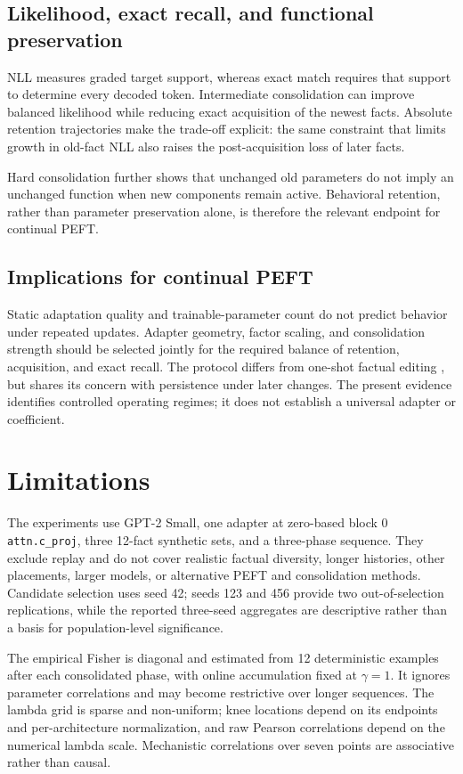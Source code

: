 \documentclass[12pt,a4paper]{article}
\begin{document}
\subsection{Likelihood, exact recall, and functional preservation}
NLL measures graded target support, whereas exact match requires that support to determine every decoded token. Intermediate consolidation can improve balanced likelihood while reducing exact acquisition of the newest facts. Absolute retention trajectories make the trade-off explicit: the same constraint that limits growth in old-fact NLL also raises the post-acquisition loss of later facts.

Hard consolidation further shows that unchanged old parameters do not imply an unchanged function when new components remain active. Behavioral retention, rather than parameter preservation alone, is therefore the relevant endpoint for continual PEFT.

\subsection{Implications for continual PEFT}
Static adaptation quality and trainable-parameter count do not predict behavior under repeated updates. Adapter geometry, factor scaling, and consolidation strength should be selected jointly for the required balance of retention, acquisition, and exact recall. The protocol differs from one-shot factual editing \cite{ref9,ref10,ref11,ref12}, but shares its concern with persistence under later changes. The present evidence identifies controlled operating regimes; it does not establish a universal adapter or coefficient.

\section{Limitations}
The experiments use GPT-2 Small, one adapter at zero-based block 0 \texttt{attn.c\_proj}, three 12-fact synthetic sets, and a three-phase sequence. They exclude replay and do not cover realistic factual diversity, longer histories, other placements, larger models, or alternative PEFT and consolidation methods. Candidate selection uses seed 42; seeds 123 and 456 provide two out-of-selection replications, while the reported three-seed aggregates are descriptive rather than a basis for population-level significance.

The empirical Fisher is diagonal and estimated from 12 deterministic examples after each consolidated phase, with online accumulation fixed at \(\gamma=1\). It ignores parameter correlations and may become restrictive over longer sequences. The lambda grid is sparse and non-uniform; knee locations depend on its endpoints and per-architecture normalization, and raw Pearson correlations depend on the numerical lambda scale. Mechanistic correlations over seven points are associative rather than causal.
\end{document}
